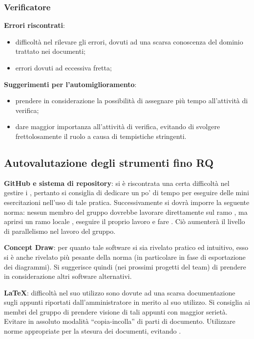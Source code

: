 \subsubsection{Verificatore}

\begin{description}
	\item \textbf{Errori riscontrati}:
		\begin{itemize}
			\item difficoltà nel rilevare gli errori, dovuti ad una scarsa conoscenza del dominio trattato nei documenti;
			\item errori dovuti ad eccessiva fretta;
		\end{itemize}
	\item \textbf{Suggerimenti per l'automiglioramento}:
		\begin{itemize}
			\item prendere in considerazione la possibilità di assegnare più tempo all'attività di verifica;
			\item dare maggior importanza all'attività di verifica, evitando di svolgere frettolosamente il ruolo a causa di tempistiche stringenti.
		\end{itemize}
\end{description}

\subsection{Autovalutazione degli strumenti fino RQ}

\begin{description}
	\item \textbf{GitHub e sistema di repository}: si è riscontrata una certa difficoltà nel gestire i , pertanto si consiglia di dedicare un po' di tempo per eseguire delle mini esercitazioni nell'uso di tale pratica. Successivamente si dovrà imporre la seguente norma: nessun membro del gruppo dovrebbe lavorare direttamente sul ramo , ma aprirsi un ramo locale , eseguire il proprio lavoro e fare . Ciò aumenterà il livello di parallelismo nel lavoro del gruppo.
	\item \textbf{Concept Draw}: per quanto tale software si sia rivelato pratico ed intuitivo, esso si è anche rivelato più pesante della norma (in particolare in fase di esportazione dei diagrammi).  Si suggerisce quindi (nei prossimi progetti del team) di prendere in considerazione altri software alternativi.
	\item \textbf{LaTeX}: difficoltà nel suo utilizzo sono dovute ad una scarsa documentazione sugli appunti riportati dall'amministratore in merito al suo utilizzo. Si consiglia ai membri del gruppo di prendere visione di tali appunti con maggior serietà. Evitare in assoluto modalità ``copia-incolla'' di parti di documento. Utilizzare norme appropriate  per la stesura dei documenti, evitando .
\end{description}

